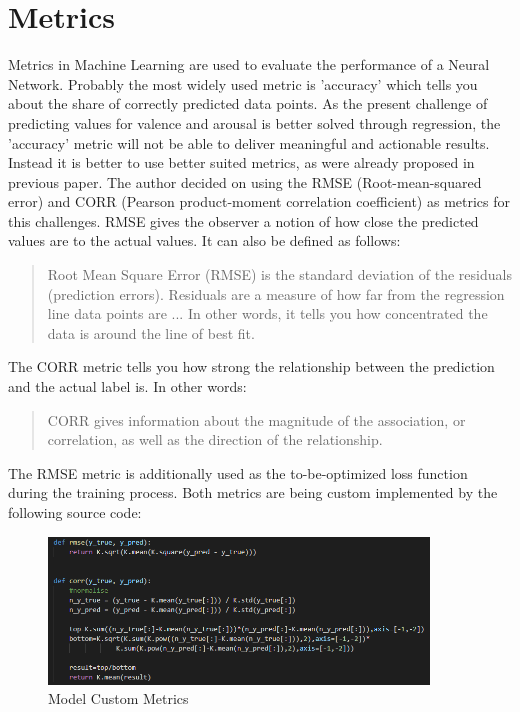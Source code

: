 \section{Metrics}
Metrics in Machine Learning are used to evaluate the performance of a Neural Network. Probably the most widely used metric is 'accuracy' which tells you about the share of correctly predicted data points. 
\newline\newline
As the present challenge of predicting values for valence and arousal is better solved through regression, the 'accuracy' metric will not be able to deliver meaningful and actionable results. Instead it is better to use better suited metrics, as were already proposed in previous paper. The author decided on using the RMSE (Root-mean-squared error) and CORR (Pearson product-moment correlation coefficient) as metrics for this challenges.
\newline\newline
RMSE gives the observer a notion of how close the predicted values are to the actual values. It can also be defined as follows:

\begin{quote}
    Root Mean Square Error (RMSE) is the standard deviation of the residuals (prediction errors). Residuals are a measure of how far from the regression line data points are ... In other words, it tells you how concentrated the data is around the line of best fit. \citep{2020:RMSE}
\end{quote}

The CORR metric tells you how strong the relationship between the prediction and the actual label is. In other words:

\begin{quote}
    CORR gives information about the magnitude of the association, or correlation, as well as the direction of the relationship. \citep{2020:PearsonCorrelation}
\end{quote}

The RMSE metric is additionally used as the to-be-optimized loss function during the training process. Both metrics are being custom implemented by the following source code:

\begin{figure}[H]
  \begin{center}
  \includegraphics[angle=0, width=0.9\textwidth]{Figures/model_metrics.PNG}
  \caption{Model Custom Metrics}
  \label{fig:ModelCustomMetrics}
  \end{center}
\end{figure}


